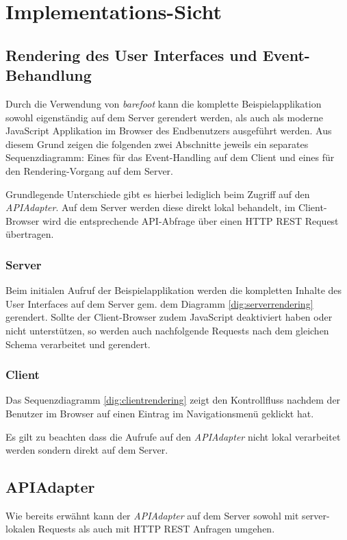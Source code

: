 \section{Implementations-Sicht}
\label{sec:sad-implementation}

\subsection{Rendering des User Interfaces und Event-Behandlung}
Durch die Verwendung von \emph{barefoot} \cite{Barefoot} kann die komplette Beispielapplikation sowohl eigenständig auf dem Server gerendert werden, als auch als moderne JavaScript Applikation im Browser des Endbenutzers ausgeführt werden. Aus diesem Grund zeigen die folgenden zwei Abschnitte jeweils ein separates Sequenzdiagramm: Eines für das Event-Handling auf dem Client und eines für den Rendering-Vorgang auf dem Server.

Grundlegende Unterschiede gibt es hierbei lediglich beim Zugriff auf den \emph{APIAdapter}. Auf dem Server werden diese direkt lokal behandelt, im Client-Browser wird die entsprechende API-Abfrage über einen HTTP REST Request übertragen.

\subsubsection*{Server}
Beim initialen Aufruf der Beispielapplikation werden die kompletten Inhalte des User Interfaces auf dem Server gem. dem Diagramm \ref{dig:serverrendering} gerendert. Sollte der Client-Browser zudem JavaScript deaktiviert haben oder nicht unterstützen, so werden auch nachfolgende Requests nach dem gleichen Schema verarbeitet und gerendert.



\subsubsection*{Client}
Das Sequenzdiagramm \ref{dig:clientrendering} zeigt den Kontrollfluss nachdem der Benutzer im Browser auf einen Eintrag im Navigationsmenü geklickt hat.

Es gilt zu beachten dass die Aufrufe auf den \emph{APIAdapter} nicht lokal verarbeitet werden sondern direkt auf dem Server.




\subsection{APIAdapter}
Wie bereits erwähnt kann der \emph{APIAdapter} auf dem Server sowohl mit server-lokalen Requests als auch mit HTTP REST Anfragen umgehen.

